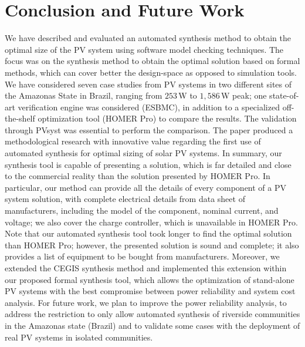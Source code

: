 \documentclass[journal]{IEEEtran}
\begin{document}
\section{Conclusion and Future Work}
\label{sec:Conclusion}
We have described and evaluated an automated synthesis method to obtain the optimal size of the PV system using software model checking techniques. The focus was on the synthesis method to obtain the optimal solution based on formal methods, which can cover better the design-space as opposed to simulation tools. We have considered seven case studies from PV systems in two different sites of the Amazonas State in Brazil, ranging from $253$\,W to $1,586$\,W peak; one state-of-art verification engine was considered (ESBMC), in addition to a specialized off-the-shelf optimization tool (HOMER Pro) to compare the results. The  validation through PVsyst was essential to perform the comparison. The paper produced a methodological research with innovative value regarding the first use of automated synthesis for optimal sizing of solar PV systems. In summary, our synthesis tool is capable of presenting a solution, which is far detailed and close to the commercial reality than the solution presented by HOMER Pro. In particular, our method can provide all the details of every component of a PV system solution, with complete electrical details from data sheet of manufacturers, including the model of the component, nominal current, and voltage; we also cover the charge controller, which is unavailable in HOMER Pro. Note that our automated synthesis tool took longer to find the optimal solution than HOMER Pro; however, the presented solution is sound and complete; it also provides a list of equipment to be bought from manufacturers. Moreover, we extended the CEGIS synthesis method and implemented this extension within our proposed formal synthesis tool, which allows the optimization of stand-alone PV systems with the best compromise between power reliability and system cost analysis. For future work, we plan to improve the power reliability analysis, to address the restriction to only allow automated synthesis of riverside communities in the Amazonas state (Brazil) and to validate some cases with the deployment of real PV systems in isolated communities.
\end{document}
